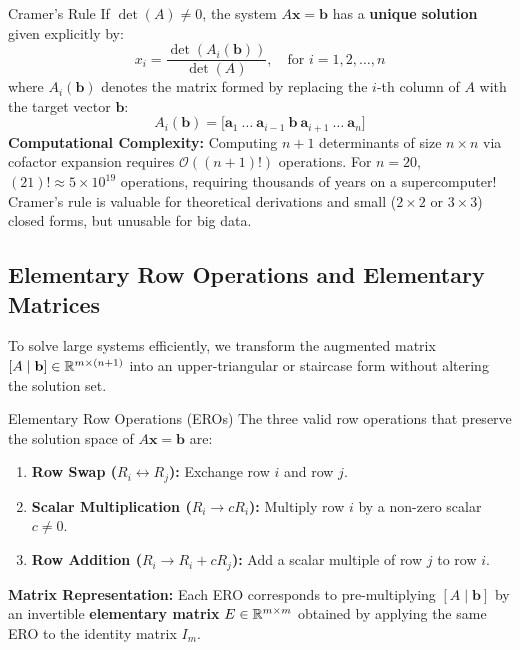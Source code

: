 \begin{theorembox}{Cramer's Rule}
If $\det(A) \neq 0$, the system $A\mathbf{x} = \mathbf{b}$ has a \textbf{unique solution} given explicitly by:
\begin{equation}
x_i = \frac{\det(A_i(\mathbf{b}))}{\det(A)}, \quad \text{for } i = 1, 2, \dots, n
\end{equation}
where $A_i(\mathbf{b})$ denotes the matrix formed by replacing the $i$-th column of $A$ with the target vector $\mathbf{b}$:
\begin{equation}
A_i(\mathbf{b}) = \Big[ \mathbf{a}_1 \ \dots \ \mathbf{a}_{i-1} \ \mathbf{b} \ \mathbf{a}_{i+1} \ \dots \ \mathbf{a}_n \Big]
\end{equation}
\textbf{Computational Complexity:} Computing $n + 1$ determinants of size $n \times n$ via cofactor expansion requires $\mathcal{O}((n+1)!)$ operations. For $n = 20$, $(21)! \approx 5 \times 10^{19}$ operations, requiring thousands of years on a supercomputer! Cramer's rule is valuable for theoretical derivations and small ($2 \times 2$ or $3 \times 3$) closed forms, but unusable for big data.
\end{theorembox}

\subsection{Elementary Row Operations and Elementary Matrices}

To solve large systems efficiently, we transform the augmented matrix $[A \mid \mathbf{b}] \in \mathbb{R}^{m \times (n+1)}$ into an upper-triangular or staircase form without altering the solution set.

\begin{definitionbox}{Elementary Row Operations (EROs)}
The three valid row operations that preserve the solution space of $A\mathbf{x} = \mathbf{b}$ are:
\begin{enumerate}
    \item \textbf{Row Swap ($R_i \leftrightarrow R_j$):} Exchange row $i$ and row $j$.
    \item \textbf{Scalar Multiplication ($R_i \to c R_i$):} Multiply row $i$ by a non-zero scalar $c \neq 0$.
    \item \textbf{Row Addition ($R_i \to R_i + c R_j$):} Add a scalar multiple of row $j$ to row $i$.
\end{enumerate}
\textbf{Matrix Representation:} Each ERO corresponds to pre-multiplying $[A \mid \mathbf{b}]$ by an invertible \textbf{elementary matrix} $E \in \mathbb{R}^{m \times m}$ obtained by applying the same ERO to the identity matrix $I_m$.
\end{definitionbox}

